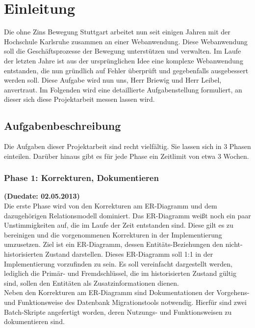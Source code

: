 \documentclass[12pt,             %
               a4paper,          %
               listof=totoc,     %
               index=totoc,      %
               bibliography=totoc,%
               oneside,         %
               BCOR1cm,          %
               english   %
               ]{scrbook}
\begin{document}
\chapter{Einleitung}
Die ohne Zins Bewegung Stuttgart arbeitet nun seit einigen Jahren mit der Hochschule Karlsruhe zusammen an einer Webanwendung. Diese Webanwendung soll die Geschäftsprozesse der Bewegung unterstützen und verwalten. Im Laufe der letzten Jahre ist aus der ursprünglichen Idee eine komplexe Webanwendung entstanden, die nun gründlich auf Fehler überprüft und gegebenfalls ausgebessert werden soll. 
Diese Aufgabe wird nun uns, Herr Briewig und Herr Leibel, anvertraut. Im Folgenden wird eine detaillierte Aufgabenstellung formuliert, an dieser sich diese Projektarbeit messen lassen wird.  

\section{Aufgabenbeschreibung}
Die Aufgaben dieser Projektarbeit sind recht vielfältig. Sie lassen sich in 3 Phasen einteilen. Darüber hinaus gibt es für jede Phase ein Zeitlimit von etwa 3 Wochen.

\subsection{Phase 1: Korrekturen, Dokumentieren}
\textbf {(Duedate: 02.05.2013)}\\
Die erste Phase wird von den Korrekturen am ER-Diagramm und dem dazugehörigen Relationsmodell dominiert. Das ER-Diagramm weißt noch ein paar Unstimmigkeiten auf, die im Laufe der Zeit entstanden sind. Diese gilt es zu bereinigen und die vorgenommenen Korrekturen in der Implementierung umzusetzen. Ziel ist ein ER-Diagramm, dessen Entitäts-Beziehungen den nicht-historisierten Zustand darstellen. Dieses ER-Diagramm soll 1:1 in der Implementierung vorzufinden zu sein. Es soll vereinfacht dargestellt werden, lediglich die Primär- und Fremdschlüssel, die im historisierten Zustand gültig sind, sollen den Entitäten als Zusatzinformationen dienen.\\

Neben den Korrekturen am ER-Diagramm sind Dokumentationen der Vorgehens- und Funktionsweise des Datenbank Migrationstools notwendig. Hierfür sind zwei Batch-Skripte angefertigt worden, deren Nutzungs- und Funktionsweisen zu dokumentieren sind.\\
\end{document}
